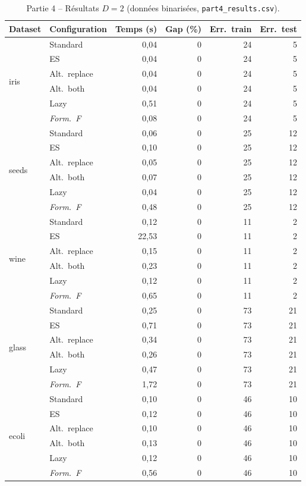 \documentclass[a4paper,10pt,titlepage,leqno]{article}
\begin{document}
\begin{table}[H]
\centering
\caption{Partie 4 -- Résultats $D=2$ (données binarisées, \texttt{part4\_results.csv}).}
\label{tab:part4d2}
\small
\begin{tabular}{@{}l l r r r r@{}}
\toprule
Dataset & Configuration & Temps (s) & Gap (\%) & Err.\ train & Err.\ test \\
\midrule
\multirow{6}{*}{iris}
 & Standard       & 0{,}04 & 0 & 24 & 5 \\
 & ES             & 0{,}04 & 0 & 24 & 5 \\
 & Alt.\ replace  & 0{,}04 & 0 & 24 & 5 \\
 & Alt.\ both     & 0{,}04 & 0 & 24 & 5 \\
 & Lazy           & 0{,}51 & 0 & 24 & 5 \\
 & \textit{Form.\ F} & 0{,}08 & 0 & 24 & 5 \\
\midrule
\multirow{6}{*}{seeds}
 & Standard       & 0{,}06 & 0 & 25 & 12 \\
 & ES             & 0{,}10 & 0 & 25 & 12 \\
 & Alt.\ replace  & 0{,}05 & 0 & 25 & 12 \\
 & Alt.\ both     & 0{,}07 & 0 & 25 & 12 \\
 & Lazy           & 0{,}04 & 0 & 25 & 12 \\
 & \textit{Form.\ F} & 0{,}48 & 0 & 25 & 12 \\
\midrule
\multirow{6}{*}{wine}
 & Standard       & 0{,}12 & 0 & 11 & 2 \\
 & ES             & 22{,}53 & 0 & 11 & 2 \\
 & Alt.\ replace  & 0{,}15 & 0 & 11 & 2 \\
 & Alt.\ both     & 0{,}23 & 0 & 11 & 2 \\
 & Lazy           & 0{,}12 & 0 & 11 & 2 \\
 & \textit{Form.\ F} & 0{,}65 & 0 & 11 & 2 \\
\midrule
\multirow{6}{*}{glass}
 & Standard       & 0{,}25 & 0 & 73 & 21 \\
 & ES             & 0{,}71 & 0 & 73 & 21 \\
 & Alt.\ replace  & 0{,}34 & 0 & 73 & 21 \\
 & Alt.\ both     & 0{,}26 & 0 & 73 & 21 \\
 & Lazy           & 0{,}47 & 0 & 73 & 21 \\
 & \textit{Form.\ F} & 1{,}72 & 0 & 73 & 21 \\
\midrule
\multirow{6}{*}{ecoli}
 & Standard       & 0{,}10 & 0 & 46 & 10 \\
 & ES             & 0{,}12 & 0 & 46 & 10 \\
 & Alt.\ replace  & 0{,}10 & 0 & 46 & 10 \\
 & Alt.\ both     & 0{,}13 & 0 & 46 & 10 \\
 & Lazy           & 0{,}12 & 0 & 46 & 10 \\
 & \textit{Form.\ F} & 0{,}56 & 0 & 46 & 10 \\
\bottomrule
\end{tabular}
\end{table}
\end{document}

